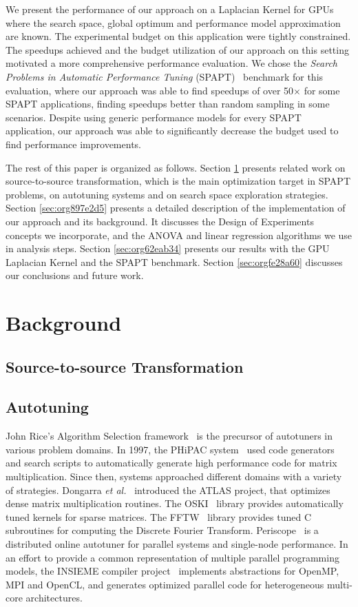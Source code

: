 \documentclass[conference]{IEEEtran}
\begin{document}
We present the performance of our approach on a Laplacian Kernel for GPUs where
the search space, global optimum and performance model approximation are known.
The experimental budget on this application were tightly constrained. The
speedups achieved and the budget utilization of our approach on this setting
motivated a more comprehensive performance evaluation. We chose the \emph{Search
Problems in Automatic Performance Tuning}
(SPAPT)~\cite{balaprakash2012spapt} benchmark for this evaluation, where
our approach was able to find speedups of over 50\(\times\) for some SPAPT
applications, finding speedups better than random sampling in some scenarios.
Despite using generic performance models for every SPAPT application, our
approach was able to significantly decrease the budget used to find performance
improvements.

The rest of this paper is organized as follows. Section \ref{sec:orged6d1a6} presents
related work on source-to-source transformation, which is the main optimization
target in SPAPT problems, on autotuning systems and on search space exploration
strategies. Section \ref{sec:org897e2d5} presents a
detailed description of the implementation of our approach and its background.
It discusses the Design of Experiments concepts we incorporate, and the ANOVA
and linear regression algorithms we use in analysis steps. Section \ref{sec:org62eab34} presents our results with the GPU Laplacian Kernel and the SPAPT
benchmark. Section \ref{sec:orgfe28a60} discusses our conclusions and future work.
\section{Background}
\label{sec:orged6d1a6}
\subsection{Source-to-source Transformation}
\label{sec:orgffef665}
\subsection{Autotuning}
\label{sec:orga87df1b}
John Rice's Algorithm Selection framework~\cite{rice1976algorithm} is the
precursor of autotuners in various problem domains. In 1997, the PHiPAC
system~\cite{bilmes1997optimizing} used code generators and search scripts
to automatically generate high performance code for matrix multiplication. Since
then, systems approached different domains with a variety of strategies.
Dongarra \emph{et al.}~\cite{dongarra1998automatically} introduced the ATLAS
project, that optimizes dense matrix multiplication routines. The
OSKI~\cite{vuduc2005oski} library provides automatically tuned kernels for
sparse matrices. The FFTW~\cite{frigo1998fftw} library provides tuned C
subroutines for computing the Discrete Fourier Transform.
Periscope~\cite{gerndt2010automatic} is a distributed online autotuner for
parallel systems and single-node performance. In an effort to provide a common
representation of multiple parallel programming models, the INSIEME compiler
project~\cite{jordan2012multi} implements abstractions for OpenMP, MPI and
OpenCL, and generates optimized parallel code for heterogeneous multi-core
architectures.
\end{document}
